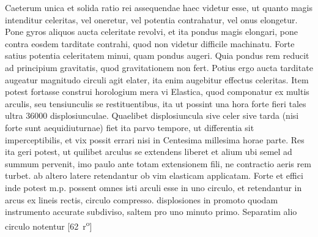 \pstart Caeterum unica et solida ratio rei assequendae haec videtur  esse, ut quanto magis intenditur celeritas\protect{}, vel oneretur, vel  potentia contrahatur, vel onus elongetur. Pone gyros aliquos aucta celeritate\protect{} revolvi, et ita pondus\protect{} magis elongari, pone contra eosdem tarditate contrahi, quod non videtur difficile machinatu. Forte  satius potentia celeritatem\protect{} minui, quam pondus\protect{} augeri. Quia pondus\protect{} rem reducit ad principium gravitatis\protect{}, quod gravitationem non  fert. Potius ergo aucta tarditate augeatur magnitudo circuli  agit elater\protect{}, ita enim augebitur effectus celeritas\protect{}.  Item potest fortasse construi horologium\protect{} mera vi Elastica\protect{}, quod componatur ex multis arculis, seu tensiunculis se restituentibus, ita ut possint  una hora forte fieri tales ultra 36000 displosiunculae. Quaelibet displosiuncula  sive celer sive tarda (nisi forte sunt aequidiuturnae) fiet ita parvo tempore, ut  differentia sit imperceptibilis, et vix possit errari nisi in Centesima millesima horae parte. Res ita geri potest, ut quilibet arculus se extendens liberet et alium  ubi semel ad summum pervenit, imo paulo ante totam extensionem fili, ne contractio aeris rem turbet.  ab altero latere retendantur ob vim\protect{}  elasticam  applicatam. Forte et effici inde potest m.p.  possent omnes isti arculi esse in uno circulo, et retendantur in arcus\protect{}   ex lineis rectis, circulo compresso.  displosiones in promoto quodam  instrumento accurate subdiviso, saltem pro uno minuto primo. Separatim alio circulo  notentur  [62~r\textsuperscript{o}]
\pend 
